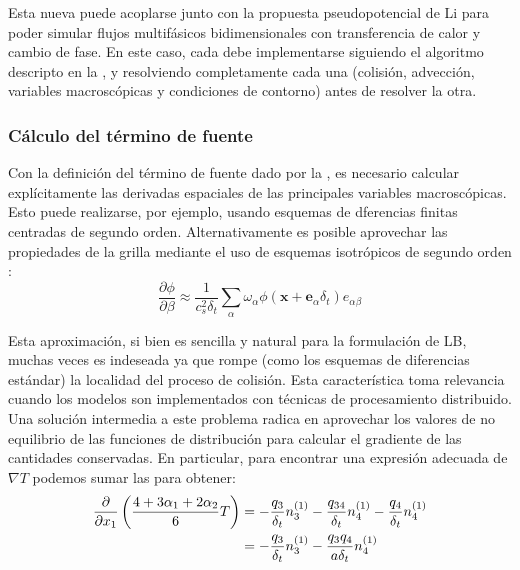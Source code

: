 Esta nueva \lbe{} puede acoplarse junto con la propuesta pseudopotencial de Li para poder simular flujos multif\'asicos bidimensionales con transferencia de calor y cambio de fase. En este caso, cada \lbe{} debe implementarse siguiendo el algoritmo descripto en la , y resolviendo completamente cada una (colisi\'on, advecci\'on, variables macrosc\'opicas y condiciones de contorno) antes de resolver la otra.


\subsubsection{C\'alculo del t\'ermino de fuente}

Con la definici\'on del t\'ermino de fuente dado por la , es necesario calcular expl\'icitamente las derivadas espaciales de las principales variables macrosc\'opicas. Esto puede realizarse, por ejemplo, usando esquemas de dferencias finitas centradas de segundo orden. Alternativamente es posible aprovechar las propiedades de la grilla mediante el uso de esquemas isotr\'opicos de segundo orden \cite{lee_stable_2005}:
\begin{equation}
	\dfrac{\partial \phi}{\partial \beta} \approx \dfrac{1}{c_s^2 \delta_t} \sum_{\alpha} \omega_{\alpha} \phi(\bm{x} + \bm{e}_{\alpha}\delta_t)e_{\alpha\beta}
\end{equation}

Esta aproximaci\'on, si bien es sencilla y natural para la formulaci\'on de LB, muchas veces es indeseada ya que rompe (como los esquemas de diferencias est\'andar) la localidad del proceso de colisi\'on. Esta caracter\'istica toma relevancia cuando los modelos son implementados con t\'ecnicas de procesamiento distribuido. Una soluci\'on intermedia a este problema radica en aprovechar los valores de no equilibrio de las funciones de distribuci\'on para calcular el gradiente de las cantidades conservadas. En particular, para encontrar una expresi\'on adecuada de $\nabla T$ podemos sumar las  para obtener:
\begin{equation}
\begin{aligned}
	\dfrac{\partial}{\partial x_1} \left( \dfrac{4+3\alpha_1+2\alpha_2}{6} T \right) &= -\dfrac{q_3}{\delta_t} n_{3}^{(1)} - \dfrac{q_{34}}{\delta_t} n_{4}^{(1)} - \dfrac{q_4}{\delta_t} n_{4}^{(1)} \\
	&= -\dfrac{q_3}{\delta_t} n_{3}^{(1)} - \dfrac{q_3 q_4}{a \delta_t} n_{4}^{(1)}
\end{aligned}
	\label{eq:partial_1_x}
\end{equation}

